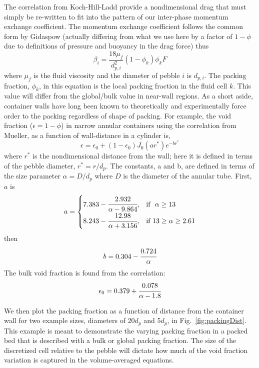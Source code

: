 The correlation from Koch-Hill-Ladd provide a nondimensional drag that must simply be re-written to fit into the pattern of our inter-phase momentum exchange coefficient. The momentum exchange coefficient follows the common form by Gidaspow\cite{gidaspow1994multiphase} (actually differing from what we use here by a factor of $1-\phi$ due to definitions of pressure and buoyancy in the drag force) thus\cite{Hoef2005,Benyahia2006}
\begin{equation}\label{eq:interphase-momentum}
	\beta_{i} = \frac{18\mu_f}{d_{p,i}^2}(1-\phi_k)\phi_k F
\end{equation}
where $\mu_f$ is the fluid viscosity and the diameter of pebble $i$ is $d_{p,i}$. The packing fraction, $\phi_k$, in this equation is the local packing fraction in the fluid cell $k$. This value will differ from the global/bulk value in near-wall regions. As a short aside, container walls have long been known to theoretically and experimentally force order to the packing regardless of shape of packing.\cite{Hunt1990,Benenati1962,Baird1958} For example, the void fraction ($\epsilon = 1-\phi$) in narrow annular containers using the correlation from Mueller, as a function of wall-distance in a cylinder is,\cite{Mueller1999}
\[
\epsilon = \epsilon_0 + (1-\epsilon_0)J_0(ar^*)e^{-br^*}
\]
where $r^*$ is the nondimensional distance from the wall; here it is defined in terms of the pebble diameter, $r^* = r/d_p$. The constants, a and b, are defined in terms of the size parameter $\alpha = D/d_p$ where $D$ is the diameter of the annular tube. First, $a$ is
\[
    a= 
\begin{cases}
    7.383 - \cfrac{2.932}{\alpha - 9.864}, & \text{if }\  \alpha \geq 13\\
    8.243 - \cfrac{12.98}{\alpha + 3.156}, & \text{if} \ 13 \geq \alpha \geq 2.61
\end{cases}
\]
then
\[
b = 0.304 - \cfrac{0.724}{\alpha}
\]
The bulk void fraction is found from the correlation:
\[
\epsilon_0 = 0.379 + \cfrac{0.078}{\alpha - 1.8}
\]

We then plot the packing fraction as a function of distance from the container wall for two example sizes, diameters of 20$d_p$ and 5$d_p$, in Fig.~\ref{fig:packingDist}. This example is meant to demonstrate the varying packing fraction in a packed bed that is described with a bulk or global packing fraction. The size of the discretized cell relative to the pebble will dictate how much of the void fraction variation is captured in the volume-averaged equations.

